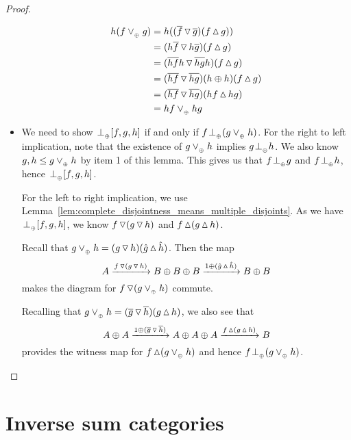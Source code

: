 \begin{proof}
\begin{itemize}
      \begin{align*}
        h (f\tjoin g) &= h ((\rst{f}\tjleft\rst{g})  (f \tjright g))\\
        &= (h\rst{f}\tjleft h\rst{g}) (f \tjright g)\\
        &= (\rst{h f}h\tjleft \rst{h g}h)  (f \tjright g)\\
        &= (\rst{h f}\tjleft \rst{h g})(h\+h)  (f \tjright g)\\
        &= (\rst{h f}\tjleft \rst{h g}) (h f \tjright hg)\\
        &= h f \tjoin h g
      \end{align*}


    \item [\axiom{DJ}{4}] We need to show $\tperp [f,g,h]$ if and only if $f \tperp (g \tjoin h)$.
      For the right to left implication, note that the existence of $g\tjoin h$ implies $g \tperp
      h$. We also know $g, h \le g\tjoin h$ by item 1 of this lemma. This gives us that $f \tperp
      g$ and $f \tperp h$, hence $\tperp [f,g,h]$.

      For the left to right implication, we use
      Lemma~\ref{lem:complete_disjointness_means_multiple_disjoints}. As we have $\tperp [f,g,h]$,
      we  know $f\tjleft(g\tjleft h)$ and $f\tjright(g\tjright h)$.

      Recall that $g\tjoin h = (g\tjleft h)(\rg{g}\tjright\rg{h})$. Then the map
      \[
        A\xrightarrow{f\tjleft(g\tjleft h)} B\+B\+B\xrightarrow{1\+(\rg{g}\tjright\rg{h})} B\+B
      \]
      makes the diagram for $f \tjleft (g\tjoin h)$ commute.

      Recalling that  $g\tjoin h =
      (\rst{g}\tjleft \rst{h})(g\tjright h)$, we also see that
      \[
        A\+A\xrightarrow{1\+(\rst{g}\tjleft\rst{h})}A\+A\+A\xrightarrow{f\tjright(g\tjright h)}B
      \]
      provides the witness map for $f \tjright(g\tjoin h)$ and hence $f \tperp (g \tjoin h)$.
  \end{itemize}

\end{proof}


\section{Inverse sum categories} %
\label{sec:inverse_sum_categories}

